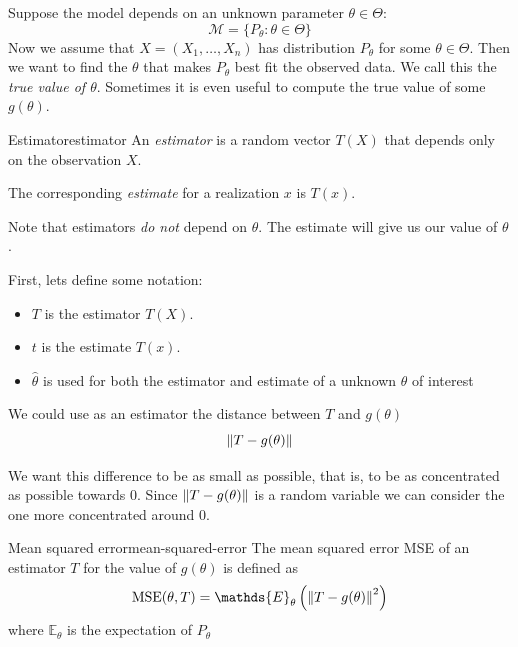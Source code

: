 \documentclass[12pt]{extarticle}
\newcommand{\E}{\mathds{E}}
\begin{document}
Suppose the model depends on an unknown parameter $\theta \in \Theta$:
\begin{equation}
    \mathcal M = \{ P_\theta : \theta \in \Theta \}
\end{equation}
Now we assume that $X = (X_1, \dots, X_n)$ has distribution $P_\theta$ for some $\theta \in \Theta$.
Then we want to find the $\theta$ that makes $P_\theta$ best fit the observed data.
We call this the \emph{true value of $\theta$}.
Sometimes it is even useful to compute the true value of some $g(\theta)$.

\begin{definition}{Estimator}{estimator}
    An \emph{estimator} is a random vector $T(X)$ that depends only on the observation $X$.

    The corresponding \emph{estimate} for a realization $x$ is $T(x)$.
\end{definition}

Note that estimators \emph{do not} depend on $\theta$.
The estimate will give us our value of $\theta$.

First, lets define some notation:
\begin{itemize}
    \item $T$ is the estimator $T(X)$.
    \item $t$ is the estimate $T(x)$.
    \item $\hat \theta$ is used for both the estimator and estimate of a unknown $\theta$ of interest
\end{itemize}

We could use as an estimator the distance between $T$ and $g(\theta)$
\begin{equation}
    \norm{T - g(\theta)}
\end{equation}

We want this difference to be as small as possible, that is, to be as concentrated as possible towards $0$.
Since $\norm{T - g(\theta)}$ is a random variable we can consider the one more concentrated around $0$.

\newcommand{\MSE}{{\operatorfont MSE}}

\begin{definition}{Mean squared error}{mean-squared-error}
    The mean squared error MSE of an estimator $T$ for the value of $g(\theta)$ is defined as
    \begin{equation}
        \MSE(\theta, T) = \E_\theta\left(\norm{T - g(\theta)}^2\right)
    \end{equation}
    where $\E_\theta$ is the expectation of $P_\theta$
\end{definition}
\end{document}

